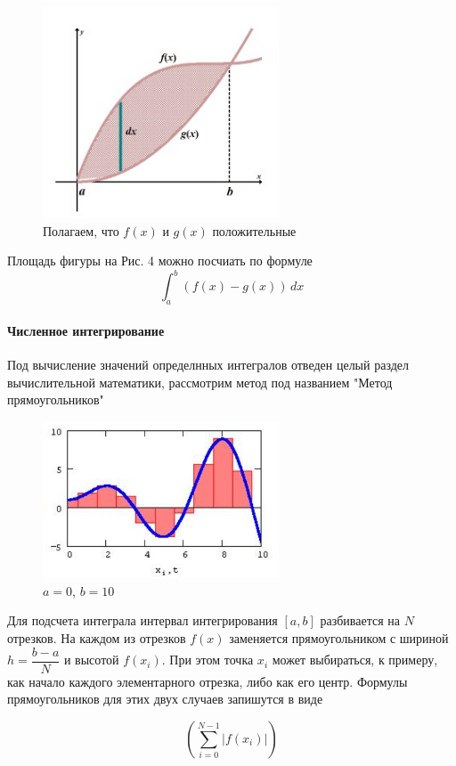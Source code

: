 \begin{figure}[H]
    \centering
    \includegraphics[width = 7cm]{integral.jpeg}
    \caption{Полагаем, что $f(x)$ и $g(x)$ положительные}
    \label{fig:float}
\end{figure}
Площадь фигуры на Рис. 4 можно посчиать по формуле
\[
    \int_a^b (f(x) - g(x)) \, dx
\]

\paragraph*{Численное интегрирование} Под вычисление значений определнных интегралов отведен целый раздел вычислительной математики, рассмотрим метод под названием "Метод прямоугольников"

\begin{figure}[H]
    \centering
    \includegraphics[width = 7cm]{Integral_numerical.jpeg}
    \caption{$a = 0$, $b = 10$}
    \label{fig:float}
\end{figure}
Для подсчета интеграла интервал интегрирования $[a,b]$ разбивается на $N$ отрезков. На каждом из отрезков $f(x)$ заменяется прямоугольником с шириной $h = \dfrac{b - a}{N}$ и высотой $f(x_i)$. При этом точка $x_i$ может выбираться, к примеру, как начало каждого элементарного отрезка, либо как его центр. Формулы прямоугольников для этих двух случаев запишутся в виде

\[
    \left( \sum_{i=0}^{N - 1} \left| f(x_i) \right| \right)
\]

